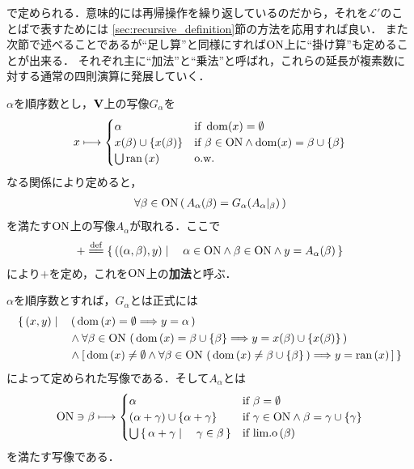 	で定められる．意味的には再帰操作を繰り返しているのだから，それを$\mathcal{L}'$のことばで表すためには
	\ref{sec:recursive_definition}節の方法を応用すれば良い．
	また次節で述べることであるが``足し算''と同様にすれば$\mathrm{ON}$上に``掛け算''も定めることが出来る．
	それぞれ主に``加法''と``乗法''と呼ばれ，これらの延長が複素数に対する通常の四則演算に発展していく．
	
	\begin{screen}
		\begin{dfn}[順序数の加法]
			$\alpha$を順序数とし，$\mathbf{V}$上の写像$G_\alpha$を
			\begin{align}
				x \longmapsto 
				\begin{cases}
					\alpha & \mbox{if } \operatorname{dom}(x) = \emptyset \\
					x(\beta) \cup \{x(\beta)\} & \mbox{if } \beta \in \mathrm{ON} \wedge \operatorname{dom}(x) = \beta \cup \{\beta\} \\
					\bigcup \operatorname*{ran} \left(x\right) & \mbox{o.w.}
				\end{cases}
			\end{align}
			なる関係により定めると，
			\begin{align}
				\forall \beta \in \mathrm{ON}\, (\, A_\alpha(\beta) = G_\alpha(A_\alpha|_\beta)\, )
			\end{align}
			を満たす$\mathrm{ON}$上の写像$A_\alpha$が取れる．ここで
			\begin{align}
				+ \defeq \Set{((\alpha,\beta),y)}{\alpha \in \ON \wedge \beta \in \ON \wedge y = A_\alpha (\beta)}
			\end{align}
			により$+$を定め，これを$\mathrm{ON}$上の{\bf 加法}と呼ぶ．
		\end{dfn}
	\end{screen}
	
	$\alpha$を順序数とすれば，$G_\alpha$とは正式には
	\begin{align}
		\{\, (x,y) \mid \quad &\left(\, \operatorname*{dom} \left(x\right) = \emptyset \Longrightarrow y = \alpha\, \right) \\
		&\wedge \forall \beta \in \mathrm{ON}\, \left(\, \operatorname*{dom} \left(x\right) = \beta \cup \{\beta\} \Longrightarrow y = x(\beta) \cup \{x(\beta)\}\, \right) \\
		&\wedge \left[\, \operatorname*{dom} \left(x\right) \neq \emptyset \wedge \forall \beta \in \mathrm{ON}\, \left(\, \operatorname*{dom} \left(x\right) \neq \beta \cup \{\beta\}\, \right)
		\Longrightarrow y = \operatorname*{ran} \left(x\right)\, \right]\, \}
	\end{align}
	によって定められた写像である．そして$A_\alpha$とは
	\begin{align}
		\mathrm{ON} \ni \beta \longmapsto
		\begin{cases}
			\alpha & \mbox{if } \beta = \emptyset \\
			(\alpha + \gamma) \cup \{\alpha + \gamma\} & \mbox{if } \gamma \in \mathrm{ON} \wedge \beta = \gamma \cup \{\gamma\} \\
			\bigcup \left\{\, \alpha + \gamma \mid \quad \gamma \in \beta\, \right\} & \mbox{if } \mathrm{lim.o}\left(\beta\right)
		\end{cases}
	\end{align}
	を満たす写像である．
	
